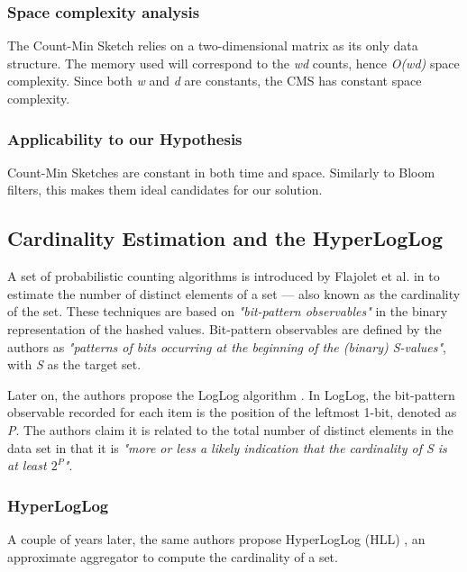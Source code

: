 \subsubsection*{Space complexity analysis}
The Count-Min Sketch relies on a two-dimensional matrix as its only data structure. The memory used will correspond to the \textit{wd} counts, hence \textit{O(wd)} space complexity. Since both \textit{w} and \textit{d} are constants, the CMS has constant space complexity.

\subsubsection*{Applicability to our Hypothesis}
Count-Min Sketches are constant in both time and space. Similarly to Bloom filters, this makes them ideal candidates for our solution. 

\subsection{Cardinality Estimation and the HyperLogLog}
A set of probabilistic counting algorithms is introduced by Flajolet et al. in \cite{Flajolet-PCA} to estimate the number of distinct elements of a set --- also known as the cardinality of the set. These techniques are based on \textit{"bit-pattern observables"} in the binary representation of the hashed values. Bit-pattern observables are defined by the authors as \textit{"patterns of bits occurring at the beginning of the (binary) S-values"}, with \textit{S} as the target set.

Later on, the authors propose the LogLog algorithm \cite{Flajolet-LogLog}. In LogLog, the bit-pattern observable recorded for each item is the position of the leftmost 1-bit, denoted as \textit{P}. The authors claim it is related to the total number of distinct elements in the data set in that it is \textit{"more or less a likely indication that the cardinality of S is at least $2^P$"}.


\subsubsection*{HyperLogLog}
A couple of years later, the same authors propose HyperLogLog (HLL) \cite{Flajolet-HLL}, an approximate aggregator to compute the cardinality of a set. 

